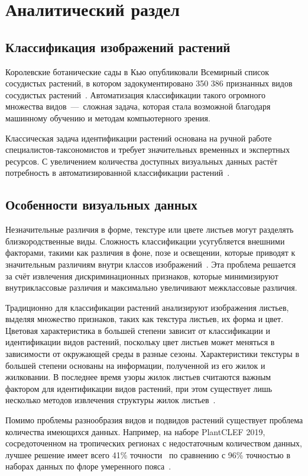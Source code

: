 \chapter{Аналитический раздел}
\section{Классификация изображений растений}
Королевские ботанические сады в Кью опубликовали Всемирный список сосудистых растений, в котором задокументировано 350 386 признанных видов сосудистых растений~\cite{ref1102}. Автоматизация классификации такого огромного множества видов~---~сложная задача, которая стала возможной благодаря машинному обучению и методам компьютерного зрения.

Классическая задача идентификации растений основана на ручной работе специалистов-таксономистов и требует значительных временных и экспертных ресурсов. С увеличением количества доступных визуальных данных растёт потребность в автоматизированной классификации растений~\cite{ref1101}.

\section{Особенности визуальных данных}
 Незначительные различия в форме, текстуре или цвете листьев могут разделять близкородственные виды. Сложность классификации усугубляется внешними факторами, такими как различия в фоне, позе и освещении, которые приводят к значительным различиям внутри классов изображений~\cite{ref1103}. Эта проблема решается за счёт извлечения дискриминационных признаков, которые минимизируют внутриклассовые различия и максимально увеличивают межклассовые различия.

Традиционно для классификации растений анализируют изображения листьев, выделяя множество признаков, таких как текстура листьев, их форма и цвет. Цветовая характеристика в большей степени зависит от классификации и идентификации видов растений, поскольку цвет листьев может меняться в зависимости от окружающей среды в разные сезоны. Характеристики текстуры в большей степени основаны на информации, полученной из его жилок и жилковании. В последнее время узоры жилок листьев считаются важным фактором для идентификации видов растений, при этом существует лишь несколько методов извлечения структуры жилок листьев~\cite{ref1101}.

Помимо проблемы разнообразия видов и подвидов растений существует проблема количества имеющихся данных. Например, на наборе PlantCLEF 2019, сосредоточенном на тропических регионах с недостаточным количеством данных, лучшее решение имеет всего 41\% точности~\cite{ref1104} по сравнению с
96\% точностью в наборах данных по флоре умеренного пояса~\cite{ref1105}.


